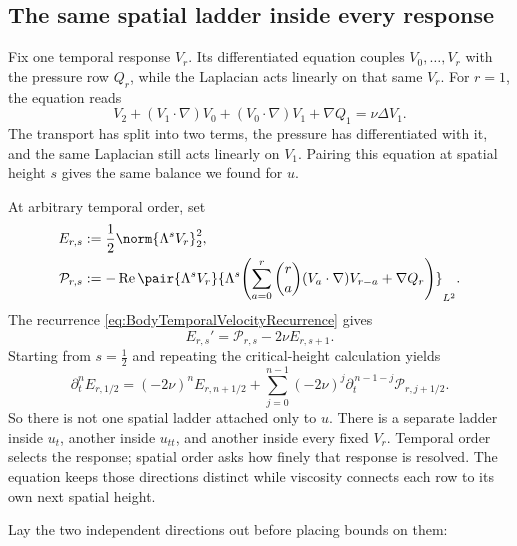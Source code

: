 \subsection{The same spatial ladder inside every response}\label{sub:SobolevRegularityInsideEveryCompletedRow}

Fix one temporal response \(V_r\).  Its differentiated equation couples
\(V_0,\ldots,V_r\) with the pressure row \(Q_r\), while the Laplacian acts linearly
on that same \(V_r\).  For \(r=1\), the equation reads
\[
  V_2
  +(V_1\cdot\nabla)V_0
  +(V_0\cdot\nabla)V_1
  +\nabla Q_1
  =\nu\Delta V_1.
\]
The transport has split into two terms, the pressure has differentiated with it, and
the same Laplacian still acts linearly on \(V_1\).  Pairing this equation at spatial
height \(s\) gives the same balance we found for \(u\).

At arbitrary temporal order, set
\begin{align*}
  E_{r,s}
  &:=\frac12\norm{\Lambda^sV_r}_2^2,
  \\
  \mathcal P_{r,s}
  &:=-\operatorname{Re}
  \pair{\Lambda^sV_r}
  {\Lambda^s\!\left(
    \sum_{a=0}^{r}\binom{r}{a}(V_a\cdot\nabla)V_{r-a}
    +\nabla Q_r
  \right)}_{L^2}.
\end{align*}
The recurrence \eqref{eq:BodyTemporalVelocityRecurrence} gives
\begin{equation}\label{eq:BodyEveryTemporalRowSpatialEnergy}
  E_{r,s}'=\mathcal P_{r,s}-2\nu E_{r,s+1}.
\end{equation}
Starting from \(s=\tfrac12\) and repeating the critical-height calculation yields
\begin{equation}\label{eq:BodyEveryTemporalRowCompletedHeight}
  \partial_t^nE_{r,1/2}
  =(-2\nu)^nE_{r,n+1/2}
  +\sum_{j=0}^{n-1}
  (-2\nu)^j
  \partial_t^{\,n-1-j}\mathcal P_{r,j+1/2}.
\end{equation}
So there is not one spatial ladder attached only to \(u\).  There is a separate ladder
inside \(u_t\), another inside \(u_{tt}\), and another inside every fixed \(V_r\).
Temporal order selects the response; spatial order asks how finely that response is
resolved.  The equation keeps those directions distinct while viscosity connects each
row to its own next spatial height.

Lay the two independent directions out before placing bounds on them:


